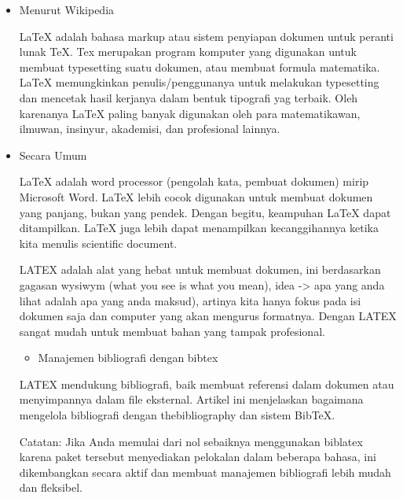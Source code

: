 
\begin{itemize}
	\item Menurut Wikipedia \par

LaTeX adalah bahasa markup atau sistem penyiapan dokumen untuk peranti lunak TeX. Tex merupakan program komputer yang digunakan untuk membuat typesetting suatu dokumen, atau membuat formula matematika. LaTeX memungkinkan penulis/penggunanya untuk melakukan typesetting dan mencetak hasil kerjanya dalam bentuk tipografi yag terbaik. Oleh karenanya LaTeX paling banyak digunakan oleh para matematikawan, ilmuwan, insinyur, akademisi, dan profesional lainnya.\par

	\item Secara Umum\par

\hspace*{0.5in}LaTeX adalah word processor (pengolah kata, pembuat dokumen) mirip Microsoft Word. LaTeX lebih cocok digunakan untuk membuat dokumen yang panjang, bukan yang pendek. Dengan begitu, keampuhan LaTeX dapat ditampilkan. LaTeX juga lebih dapat menampilkan kecanggihannya ketika kita menulis scientific document.\par

LATEX adalah alat yang hebat untuk membuat dokumen, ini berdasarkan gagasan wysiwym (what you see is what you mean), idea -> apa yang anda lihat adalah apa yang anda maksud), artinya kita hanya fokus pada isi dokumen saja dan computer yang akan mengurus formatnya. Dengan LATEX sangat mudah untuk membuat bahan yang tampak profesional. \par

\begin{itemize}
	\item Manajemen bibliografi dengan bibtex
\end{itemize}\par


\noindent LATEX mendukung bibliografi, baik membuat referensi dalam dokumen atau menyimpannya dalam file eksternal. Artikel ini menjelaskan bagaimana mengelola bibliografi dengan thebibliography dan sistem BibTeX.\par


\noindent Catatan: Jika Anda memulai dari nol sebaiknya menggunakan biblatex karena paket tersebut menyediakan pelokalan dalam beberapa bahasa, ini dikembangkan secara aktif dan membuat manajemen bibliografi lebih mudah dan fleksibel.\par



\end{itemize}
